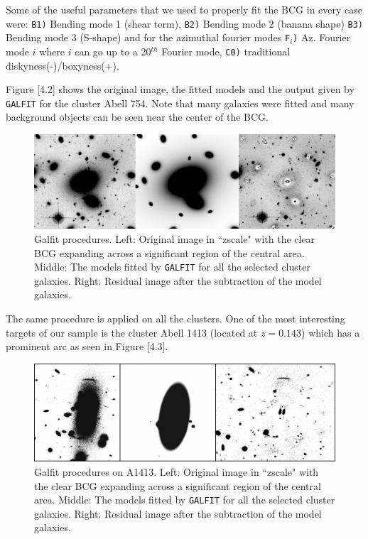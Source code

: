 Some of the useful parameters that we used to properly fit the BCG in every case were: \texttt{B1)} Bending mode 1 (shear term), \texttt{B2)} Bending mode 2 (banana shape)
\texttt{B3)} Bending mode 3 (S-shape) and for the azimuthal fourier modes
\texttt{F$_i$)} Az. Fourier mode $i$ where $i$ can go up to a 20$^{th}$ Fourier mode, \texttt{C0)}   traditional diskyness(-)/boxyness(+).

Figure [4.2] shows the original image, the fitted models and the output given by \texttt{GALFIT} for the cluster Abell 754. Note that many galaxies were fitted and many background objects can be seen near the center of the BCG. 

\begin{figure}[H]
\centering
\includegraphics[width=15cm]{images/galfit.png}
\caption[Galfit results]{Galfit procedures. Left: Original image in ``zscale" with the clear BCG expanding across a significant region of the central area. Middle: The models fitted by \texttt{GALFIT} for all the selected cluster galaxies. Right: Residual image after the subtraction of the model galaxies.}
\end{figure}

The same procedure is applied on all the clusters. One of the most interesting targets of our sample is the cluster Abell 1413 (located at $z=0.143$) which has a prominent arc as seen in Figure [4.3]. 

\begin{figure}[H]
\centering
\includegraphics[width=15cm]{images/A1413.png}
\caption[Galfit results]{Galfit procedures on A1413. Left: Original image in ``zscale" with the clear BCG expanding across a significant region of the central area. Middle: The models fitted by \texttt{GALFIT} for all the selected cluster galaxies. Right: Residual image after the subtraction of the model galaxies.}
\end{figure}

